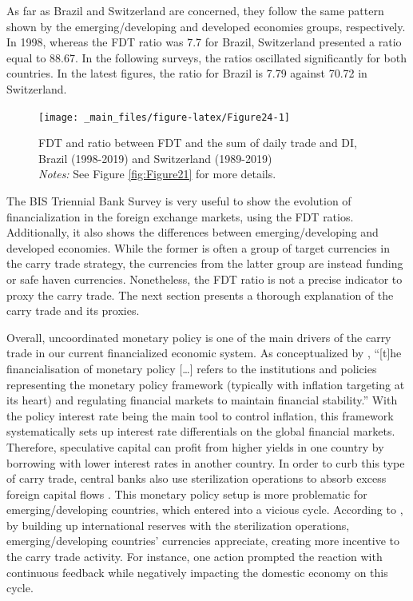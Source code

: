 \documentclass[a4paper, twoside]{templates/ociamthesis}
\begin{document}
As far as Brazil and Switzerland are concerned, they follow the same pattern shown by the emerging/developing and developed economies groups, respectively. In 1998, whereas the FDT ratio was 7.7 for Brazil, Switzerland presented a ratio equal to 88.67. In the following surveys, the ratios oscillated significantly for both countries. In the latest figures, the ratio for Brazil is 7.79 against 70.72 in Switzerland.

\begin{figure}[!ht]

{\centering \texttt{[image: \_main\_files/figure-latex/Figure24-1]} 

}

\caption[FDT and ratio between FDT and the sum of daily trade and DI, Brazil (1998-2019) and Switzerland (1989-2019)]{FDT and ratio between FDT and the sum of daily trade and DI, Brazil (1998-2019) and Switzerland (1989-2019) \\ \scriptsize \textit{Notes:} See Figure \ref{fig:Figure21} for more details.}\label{fig:Figure24}
\end{figure}

The BIS Triennial Bank Survey is very useful to show the evolution of financialization in the foreign exchange markets, using the FDT ratios. Additionally, it also shows the differences between emerging/developing and developed economies. While the former is often a group of target currencies in the carry trade strategy, the currencies from the latter group are instead funding or safe haven currencies. Nonetheless, the FDT ratio is not a precise indicator to proxy the carry trade. The next section presents a thorough explanation of the carry trade and its proxies.

Overall, uncoordinated monetary policy is one of the main drivers of the carry trade in our current financialized economic system. As conceptualized by \textcite[ 1005]{karwowski2019}, ``{[}t{]}he financialisation of monetary policy {[}\ldots{]} refers to the institutions and policies representing the monetary policy framework (typically with inflation targeting at its heart) and regulating financial markets to maintain financial stability.'' With the policy interest rate being the main tool to control inflation, this framework systematically sets up interest rate differentials on the global financial markets. Therefore, speculative capital can profit from higher yields in one country by borrowing with lower interest rates in another country. In order to curb this type of carry trade, central banks also use sterilization operations to absorb excess foreign capital flows \autocites*[Gabor][]{gabor2010,gabor2010a}. This monetary policy setup is more problematic for emerging/developing countries, which entered into a vicious cycle. According to \textcite{darista2018}, by building up international reserves with the sterilization operations, emerging/developing countries' currencies appreciate, creating more incentive to the carry trade activity. For instance, one action prompted the reaction with continuous feedback while negatively impacting the domestic economy on this cycle.
\end{document}
